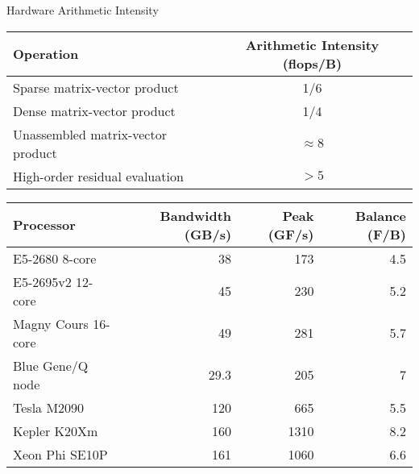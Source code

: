 \begin{frame}{Hardware Arithmetic Intensity}
  \begin{tabular}{lc}
    \toprule
    Operation                         & Arithmetic Intensity (flops/B) \\
    \midrule
    Sparse matrix-vector product      & 1/6                  \\
    Dense matrix-vector product       & 1/4                  \\
    Unassembled matrix-vector product & $\approx 8$          \\
    High-order residual evaluation    & $> 5$                \\
    \bottomrule
  \end{tabular}

  \bigskip

  \begin{tabular}{lrrr}
    \toprule
    Processor & Bandwidth (GB/s) & Peak (GF/s) & Balance (F/B) \\
    \midrule
    E5-2680 8-core      & 38   & 173  & 4.5 \\ %
    E5-2695v2 12-core & 45 & 230 & 5.2 \\ %
    Magny Cours 16-core & 49   & 281  & 5.7 \\
    Blue Gene/Q node    & 29.3   & 205  & 7 \\ %
    Tesla M2090         & 120  & 665  & 5.5 \\
    Kepler K20Xm        & 160 & 1310 & 8.2 \\ %
    Xeon Phi SE10P      & 161 & 1060 & 6.6 \\ %
    \bottomrule
  \end{tabular}
\end{frame}
